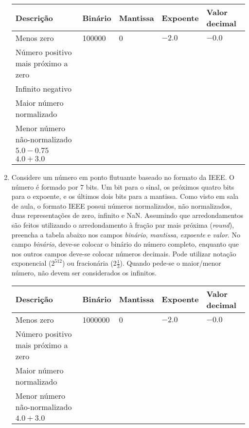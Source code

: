 \begin{enumerate}[resume]
    \begin{table}[H]
        \begin{tabular}{|l|l|l|l|l|}
            \hline
            \textbf{Descrição}  & 
            \textbf{Binário}    & 
            \textbf{Mantissa}   &
            \textbf{Expoente}   &
            \textbf{Valor decimal} \\\hline
            Menos zero & 100000 & 0 & $-2.0$ & $-0.0$ \\\hline
            Número positivo mais próximo a zero & & & & \\\hline
            Infinito negativo & & & & \\\hline
            Maior número normalizado & & & & \\\hline
            Menor número não-normalizado & & & & \\\hline
            $5.0 - 0.75$ & & & & \\\hline
            $4.0 + 3.0$ & & & & \\
            \hline
        \end{tabular}
    \end{table}

    \item
    Considere um número em ponto flutuante baseado no formato da IEEE.
    O número é formado por 7 bits. 
    Um bit para o sinal, 
    os próximos quatro bits para o expoente,
    e os últimos dois bits para a mantissa.
    Como visto em sala de aula, o formato IEEE possui números normalizados,
    não normalizados, duas representações de zero, infinito e NaN.
    Assumindo que arredondamentos são feitos utilizando
    o arredondamento à fração par mais próxima (\textit{round}),
    preencha a tabela abaixo nos campos 
    \textit{binário}, \textit{mantissa}, \textit{expoente} e \textit{valor}.
    No campo \textit{binário}, deve-se colocar o binário do número completo,
    enquanto que nos outros campos deve-se colocar números decimais.
    Pode utilizar notação exponencial ($2^{512}$) ou fracionária (2$\frac{1}{3}$).
    Quando pede-se o maior/menor número, não devem ser considerados os infinitos.

    \begin{table}[H]
        \begin{tabular}{|l|l|l|l|l|}
            \hline
            \textbf{Descrição}  & 
            \textbf{Binário}    & 
            \textbf{Mantissa}   &
            \textbf{Expoente}   &
            \textbf{Valor decimal} \\\hline
            Menos zero & 1000000 & 0 & $-2.0$ & $-0.0$ \\\hline
            Número positivo mais próximo a zero & & & & \\\hline
            Maior número normalizado & & & & \\\hline
            Menor número não-normalizado & & & & \\\hline
            $4.0 + 3.0$ & & & & \\
            \hline
        \end{tabular}
    \end{table}


\end{enumerate}
